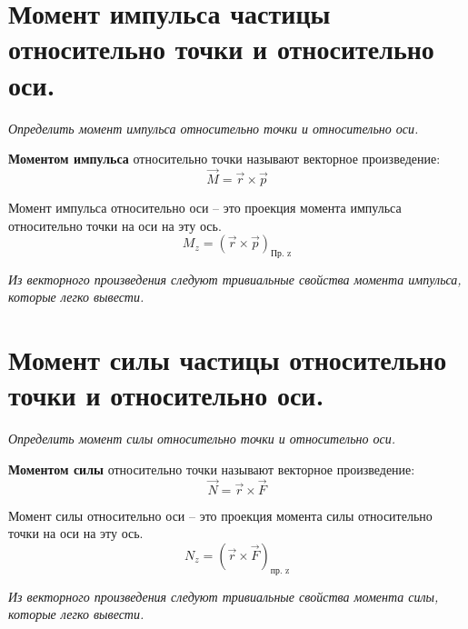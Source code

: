 \documentclass{article}
\begin{document}
   \section{Момент импульса частицы относительно точки и относительно оси.}
    \par
      \textit{Определить момент импульса относительно точки и относительно оси.}\\
    \par 
      \textbf{Моментом импульса} относительно точки называют векторное произведение:
      \begin{equation}
	\vec M=\vec r\times\vec p
      \end{equation}
    \par
      Момент импульса относительно оси -- это проекция момента импульса относительно точки на оси на эту ось.
      \begin{equation}
	M_z=(\vec r\times\vec p)_\text{Пр. z}
      \end{equation}
    \par
      \textit{Из векторного произведения следуют тривиальные свойства момента импульса, которые легко вывести.}
  \clearpage
    
   \section{Момент силы частицы относительно точки и относительно оси.}
    \par
      \textit{Определить момент силы относительно точки и относительно оси.}\\
    \par 
      \textbf{Моментом силы} относительно точки называют векторное произведение:
      \begin{equation}
	\vec N=\vec r\times \vec F
      \end{equation}
    \par
      Момент силы относительно оси -- это проекция момента силы относительно точки на оси на эту ось.
      \begin{equation}
	N_z=(\vec r\times \vec F)_\text{пр. z}
      \end{equation}
    \par
      \textit{Из векторного произведения следуют тривиальные свойства момента силы, которые легко вывести.}
  \clearpage
    
\end{document}
